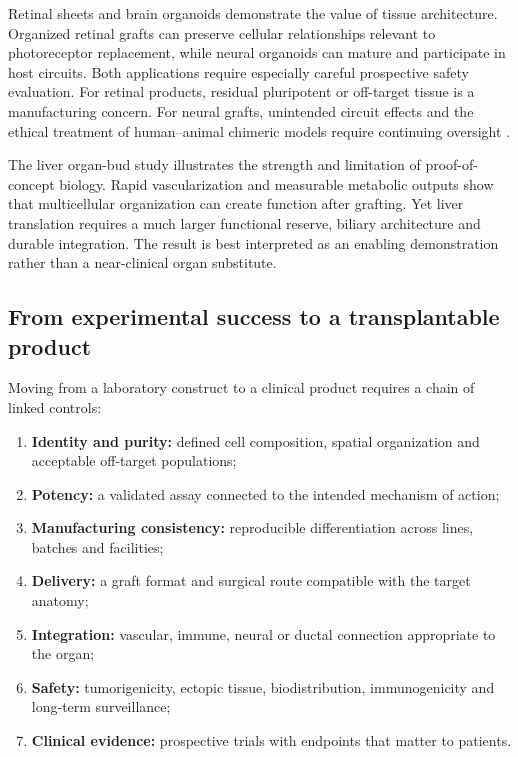 \documentclass[11pt,a4paper]{article}
\begin{document}
Retinal sheets and brain organoids demonstrate the value of tissue architecture. Organized retinal grafts can preserve cellular relationships relevant to photoreceptor replacement, while neural organoids can mature and participate in host circuits. Both applications require especially careful prospective safety evaluation. For retinal products, residual pluripotent or off-target tissue is a manufacturing concern. For neural grafts, unintended circuit effects and the ethical treatment of human--animal chimeric models require continuing oversight \citep{lovellbadge2021}.

The liver organ-bud study illustrates the strength and limitation of proof-of-concept biology. Rapid vascularization and measurable metabolic outputs show that multicellular organization can create function after grafting. Yet liver translation requires a much larger functional reserve, biliary architecture and durable integration. The result is best interpreted as an enabling demonstration rather than a near-clinical organ substitute.

\subsection{From experimental success to a transplantable product}

Moving from a laboratory construct to a clinical product requires a chain of linked controls:

\begin{enumerate}
  \item \textbf{Identity and purity:} defined cell composition, spatial organization and acceptable off-target populations;
  \item \textbf{Potency:} a validated assay connected to the intended mechanism of action;
  \item \textbf{Manufacturing consistency:} reproducible differentiation across lines, batches and facilities;
  \item \textbf{Delivery:} a graft format and surgical route compatible with the target anatomy;
  \item \textbf{Integration:} vascular, immune, neural or ductal connection appropriate to the organ;
  \item \textbf{Safety:} tumorigenicity, ectopic tissue, biodistribution, immunogenicity and long-term surveillance;
  \item \textbf{Clinical evidence:} prospective trials with endpoints that matter to patients.
\end{enumerate}
\end{document}
